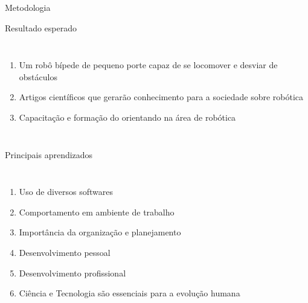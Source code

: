 \begin{frame}[c]{Metodologia}
    \begin{figure}
    \end{figure}
\end{frame}
\begin{frame}[t]{Resultado esperado} 
    \transdissolve[duration=0.5]
        \begin{columns}[t]
                \begin{enumerate}
                    \item Um robô bípede de pequeno porte capaz de se locomover e desviar de obstáculos 
                    \item Artigos científicos que gerarão conhecimento para a sociedade sobre robótica
                    \item Capacitação e formação do orientando na área de robótica
                \end{enumerate}
        \end{columns}
\end{frame}
\begin{frame}[t]{Principais aprendizados} 
    \transdissolve[duration=0.5]
        \begin{columns}[t]
                \begin{enumerate}
                    \item Uso de diversos softwares
                    \item Comportamento em ambiente de trabalho
                    \item Importância da organização e planejamento
                    \item Desenvolvimento pessoal 
                    \item Desenvolvimento profissional
                    \item Ciência e Tecnologia são essenciais para a evolução humana
                \end{enumerate}
        \end{columns}
\end{frame}
